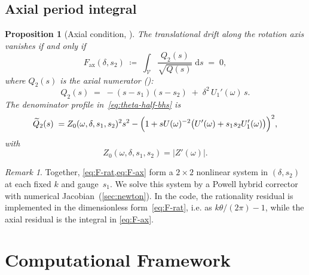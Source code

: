 \documentclass[11pt,a4paper]{article}
\theoremstyle{plain}
\newtheorem{proposition}[theorem]{Proposition}
\theoremstyle{definition}
\theoremstyle{remark}
\newtheorem{remark}[theorem]{Remark}
\newcommand{\dd}{\mathrm{d}}
\begin{document}
\subsection{Axial period integral}\label{sec:axial}

\begin{proposition}[Axial condition,
  {\cite[Eq.~83]{BHS25}}]
\label{prop:axial}
The translational drift along the rotation axis vanishes if and only if
\begin{equation}
  F_{\mathrm{ax}}(\delta,s_2)
  \;\coloneqq\;
  \int_{\mathcal{V}}
    \frac{Q_2(s)}{\sqrt{Q(s)}} \;\dd s
  \;=\; 0,
  \label{eq:F-ax}
\end{equation}
where $Q_2(s)$ is the axial numerator
(\cite[Eq.~86]{BHS25}):
\begin{equation}
  Q_2(s) \;=\; -(s - s_1)(s - s_2)
    \;+\; \delta^2\,U_1'(\omega)\,s.
  \label{eq:Q2}
\end{equation}
The denominator profile in~\eqref{eq:theta-half-bhs} is
\cite[Eq.~87]{BHS25}
\begin{equation}
  \widetilde Q_2(s)
  \;=
  Z_0(\omega,\delta,s_1,s_2)^2 s^2
  - \Bigl(1 + sU(\omega)^{-2}\bigl(U'(\omega)+s_1s_2U_1'(\omega)\bigr)\Bigr)^2,
  \label{eq:Qtilde2}
\end{equation}
with
\begin{equation}
  Z_0(\omega,\delta,s_1,s_2)=|Z'(\omega)|.
  \label{eq:Z0-def}
\end{equation}
\end{proposition}

\begin{remark}
  Together, \cref{eq:F-rat,eq:F-ax} form a $2 \times 2$ nonlinear
  system in $(\delta, s_2)$ at each fixed $k$ and gauge~$s_1$.  We
  solve this system by a Powell hybrid corrector with numerical
  Jacobian~(\cref{sec:newton}).  In the code, the rationality residual is
  implemented in the dimensionless form~\eqref{eq:F-rat}, i.e.
  as $k\theta/(2\pi)-1$, while the axial residual is the integral in
  \eqref{eq:F-ax}.
\end{remark}


\section{Computational Framework}\label{sec:computational}
\end{document}
